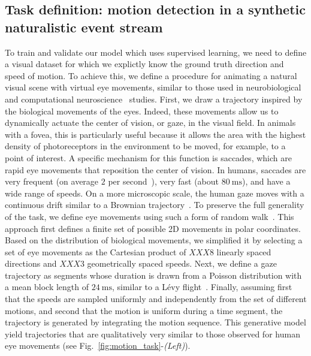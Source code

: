 \documentclass[default]{sn-jnl}%
\theoremstyle{thmstyleone}%
\theoremstyle{thmstyletwo}%
\theoremstyle{thmstylethree}%
\newcommand{\seeFig}[1]{see Fig.~\ref{fig:#1}}%
\newcommand{\ms}{\si{\milli\second}}%
\begin{document}
\subsection{Task definition: motion detection in a synthetic naturalistic event stream}\label{sec:task}
To train and validate our model which uses supervised learning, we need to define a visual dataset for which we explictly know the ground truth direction and speed of motion. To achieve this, we define a procedure for animating a natural visual scene with virtual eye movements, similar to those used in neurobiological~\citep{vinje_sparse_2000, baudot_animation_2013} and computational neuroscience~\citep{kremkow_push-pull_2016} studies. First, we draw a trajectory inspired by the biological movements of the eyes. Indeed, these movements allow us to dynamically actuate the center of vision, or gaze, in the visual field. In animals with a fovea, this is particularly useful because it allows the area with the highest density of photoreceptors in the environment to be moved, for example, to a point of interest. A specific mechanism for this function is saccades, which are rapid eye movements that reposition the center of vision. In humans, saccades are very frequent (on average $2$ per second~\citep{dandekar_neural_2012}), very fast (about $80~\ms$), and have a wide range of speeds. On a more microscopic scale, the human gaze moves with a continuous drift similar to a Brownian trajectory~\citep{poletti_head-eye_2015}. To preserve the full generality of the task, we define eye movements using such a form of random walk~\citep{engbert_integrated_2011}. This approach first defines a finite set of possible 2D movements in polar coordinates. Based on the distribution of biological movements, we simplified it by selecting a set of eye movements as the Cartesian product of $XXX8$ linearly spaced directions and $XXX3$ geometrically spaced speeds. Next, we define a gaze trajectory as segments whose duration is drawn from a Poisson distribution with a mean block length of $24~\ms$, similar to a Lévy flight~\citep[p. 289]{mandelbrot_fractal_1982}. Finally, assuming first that the speeds are sampled uniformly and independently from the set of different motions, and second that the motion is uniform during a time segment,  the trajectory is generated by integrating the motion sequence. This generative model yield trajectories that are qualitatively very similar to those observed for human eye movements (\seeFig{motion_task}-\textit{(Left)}).
\end{document}
